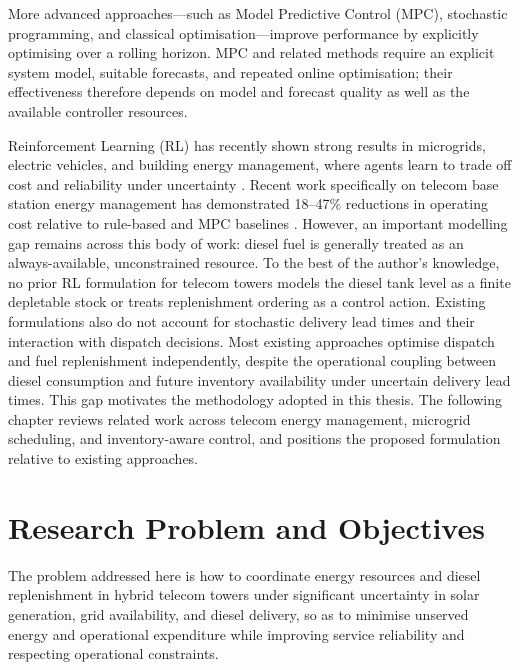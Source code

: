 More advanced approaches---such as Model Predictive Control (MPC), stochastic
programming, and classical optimisation---improve performance by explicitly
optimising over a rolling horizon. MPC and related methods require an
explicit system model, suitable forecasts, and repeated online
optimisation; their effectiveness therefore depends on model and forecast
quality as well as the available controller resources.

Reinforcement Learning (RL) has recently shown strong results in microgrids,
electric vehicles, and building energy management, where agents learn to trade
off cost and reliability under uncertainty
\citep{mao2021_inventory_rl,lin_ev_rl_2024,wang2022_building_rl}. Recent
work specifically on telecom base station energy management has demonstrated
18--47\% reductions in operating cost relative to rule-based and MPC baselines
\citep{ma_pan_2025_telecom_ies,yan_2025_safe_marl_bs,alhajhassan_2024_battery_ageing_rl}.
However, an important modelling gap remains across this body of work: diesel fuel is
generally treated as an always-available, unconstrained resource. To the best
of the author's knowledge, no prior RL formulation for telecom towers models
the diesel tank level as a finite depletable stock or treats replenishment
ordering as a control action. Existing formulations also do not account for
stochastic delivery lead times and their interaction with dispatch decisions.
Most existing approaches optimise dispatch and fuel replenishment
independently, despite the operational coupling between diesel consumption
and future inventory availability under uncertain delivery lead times. This
gap motivates the
methodology adopted in this thesis. The following chapter reviews related
work across telecom energy management, microgrid scheduling, and
inventory-aware control, and positions the proposed formulation relative
to existing approaches.


\section{Research Problem and Objectives}

The problem addressed here is how to coordinate energy resources
and diesel replenishment in hybrid telecom towers under significant uncertainty
in solar generation, grid availability, and diesel delivery, so as to minimise
unserved energy and operational expenditure while improving service
reliability and respecting operational constraints.

